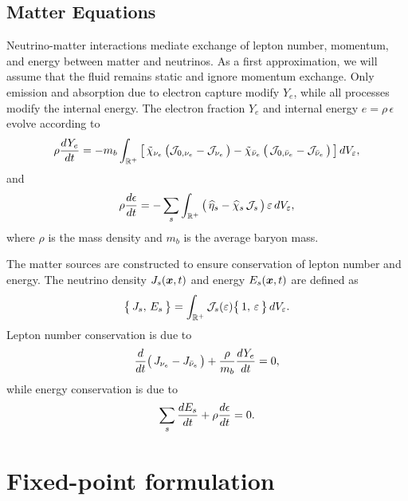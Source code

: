 \documentclass[12pt]{article}
\begin{document}
\subsection{Matter Equations}

Neutrino-matter interactions mediate exchange of lepton number, momentum, and energy between matter and neutrinos.  
As a first approximation, we will assume that the fluid remains static and ignore momentum exchange.  
Only emission and absorption due to electron capture modify $Y_{e}$, while all processes modify the internal energy.  
The electron fraction $Y_{e}$ and internal energy $e=\rho\,\epsilon$ evolve according to
\begin{equation}
  \rho\frac{d Y_{e}}{d t}
  =-m_{b}\int_{\mathbb{R}^{+}}
  \big[\,
    \tilde{\chi}_{\nu_{e}}\,\big(\mathcal{J}_{0,\nu_{e}}-\mathcal{J}_{\nu_{e}}\,\big)
    -\tilde{\chi}_{\bar{\nu}_{e}}\,\big(\,\mathcal{J}_{0,\bar{\nu}_{e}}-\mathcal{J}_{\bar{\nu}_{e}}\,\big)
  \,\big]\,dV_{\varepsilon},
\end{equation}
and
\begin{equation}
  \rho\frac{d \epsilon}{d t}
  =-\sum_{s}\int_{\mathbb{R}^{+}}\big(\,\widehat{\eta}_{s} - \widehat{\chi}_{s}\,\mathcal{J}_{s}\,\big)\,\varepsilon\,dV_{\varepsilon},
\end{equation}
where $\rho$ is the mass density and $m_{b}$ is the average baryon mass.  

The matter sources are constructed to ensure conservation of lepton number and energy.  
The neutrino density $J_{s}(\boldsymbol{x},t)$ and energy $E_{s}(\boldsymbol{x},t)$ are defined as
\begin{equation}
  \big\{\,J_{s},\,E_{s}\,\big\}
  =\int_{\mathbb{R}^{+}}\mathcal{J}_{s}(\varepsilon)\big\{\,1,\,\varepsilon\,\big\}\,dV_{\varepsilon}.
\end{equation}
Lepton number conservation is due to
\begin{equation}\label{eq:LeptonConservation}
  \frac{d }{d t}\big(\,J_{\nu_{e}}-J_{\bar{\nu}_{e}}\,\big)+\frac{\rho}{m_{b}}\frac{d Y_{e}}{d t} = 0,
\end{equation}
while energy conservation is due to
\begin{equation}\label{eq:EnergyConservation}
  \sum_{s}\frac{d E_{s}}{d t}+\rho\frac{d \epsilon}{d t} = 0.
\end{equation}


\section{Fixed-point formulation}
\end{document}
